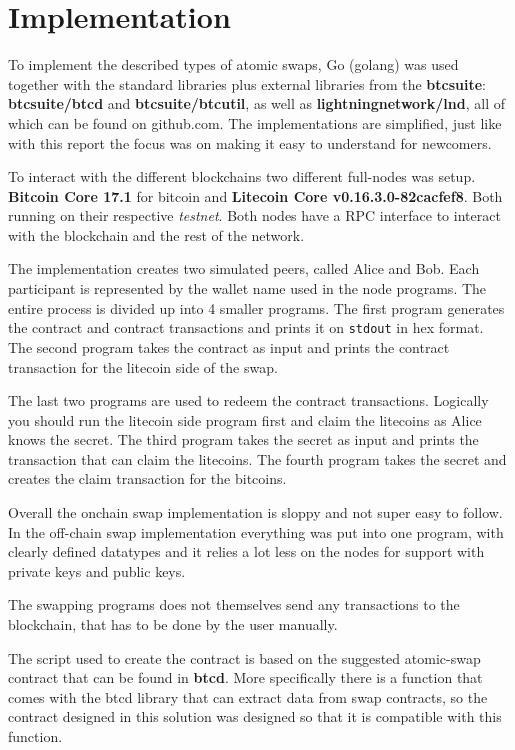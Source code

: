 \chapter{Implementation}
To implement the described types of atomic swaps, Go (golang) was used 
together with the standard libraries plus external libraries from the 
\textbf{btcsuite}: \textbf{btcsuite/btcd} and \textbf{btcsuite/btcutil}, 
as well as \textbf{lightningnetwork/lnd}, all of which can be found 
on github.com. The implementations are simplified, just like with 
this report the focus was on making it easy to understand for newcomers. 

To interact with the different blockchains two different full-nodes 
was setup. \textbf{Bitcoin Core 17.1} for bitcoin and 
\textbf{Litecoin Core  v0.16.3.0-82cacfef8}. Both running on their 
respective \textit{testnet}. Both nodes have a RPC interface to interact 
with the blockchain and the rest of the network. 

The implementation creates two simulated peers, called Alice and Bob. 
Each participant is represented by the wallet name used in the node
programs. The entire process is divided up into 4 smaller programs.
The first program generates the contract and contract transactions and 
prints it on \texttt{stdout} in hex format. The second program takes 
the contract as input and prints the contract transaction for the 
litecoin side of the swap. 

The last two programs are used to redeem the contract transactions.
Logically you should run the litecoin side program first and
claim the litecoins as Alice knows the secret. The third program
takes the secret as input and prints the transaction that can
claim the litecoins. The fourth program takes the secret and creates 
the claim transaction for the bitcoins. 

Overall the onchain swap implementation is sloppy and not super easy to follow. 
In the off-chain swap implementation everything was put into one program, with 
clearly defined datatypes and it relies a lot less on the nodes for support 
with private keys and public keys.

The swapping programs does not themselves send any transactions to the blockchain,
that has to be done by the user manually. 

The script used to create the contract is based on the suggested atomic-swap 
contract that can be found in \textbf{btcd}. More specifically there 
is a function that comes with the btcd library that can extract data from 
swap contracts, so the contract designed in this solution was designed so that
it is compatible with this function. 

